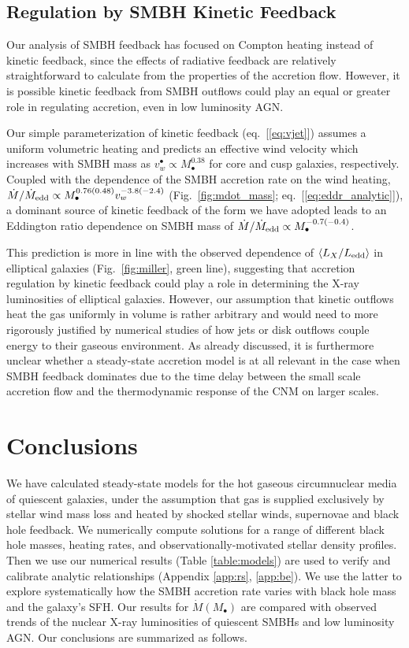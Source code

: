 \documentclass[usenatbib,fleqn]{mn2e}
\newcommand{\Mbh}[1][]{M_{\bullet#1}}
\begin{document}
\subsection{Regulation by SMBH Kinetic Feedback}
\label{sec:kinetic}

Our analysis of SMBH feedback has focused on Compton heating instead
of kinetic feedback, since the effects of radiative feedback are
relatively straightforward to calculate from the properties of the
accretion flow.  However, it is possible kinetic feedback from SMBH
outflows could play an equal or greater role in regulating accretion,
even in low luminosity AGN.

Our simple parameterization of kinetic feedback (eq.~[\ref{eq:vjet}])
assumes a uniform volumetric heating and predicts an effective wind
velocity which increases with SMBH mass as $v_{w}^{\bullet} \propto
M_{\bullet}^{0.38}$ for core and cusp galaxies, respectively.
Coupled with the dependence of the SMBH accretion rate on the wind
heating, $\dot{M}/\dot{M}_{\rm edd} \propto
M_{\bullet}^{0.76(0.48)}v_{w}^{-3.8(-2.4)}$ (Fig.~\ref{fig:mdot_mass};
eq.~[\ref{eq:eddr_analytic}]), a dominant source of kinetic feedback
of the form we have adopted leads to an Eddington ratio dependence on
SMBH mass of $\dot{M}/\dot{M}_{\rm edd} \propto
M_{\bullet}^{-0.7(-0.4)}$.

This prediction is more in line with the observed dependence of
$\langle L_{X}/L_{\rm edd} \rangle$ in elliptical galaxies
(Fig.~\ref{fig:miller}, green line), suggesting that accretion
regulation by kinetic feedback could play a role in determining the
X-ray luminosities of elliptical galaxies.  However, our assumption
that kinetic outflows heat the gas uniformly in volume is rather
arbitrary and would need to more rigorously justified by numerical
studies of how jets or disk outflows couple energy to their gaseous
environment.  As already discussed, it is furthermore unclear whether
a steady-state accretion model is at all relevant in the case when
SMBH feedback dominates due to the time delay between the small scale
accretion flow and the thermodynamic response of the CNM on larger
scales.


\section{Conclusions}
\label{sec:conclusions}

We have calculated steady-state models for the hot gaseous
circumnuclear media of quiescent galaxies, under the assumption that
gas is supplied exclusively by stellar wind mass loss and heated by
shocked stellar winds, supernovae and black hole feedback.  We
numerically compute solutions for a range of different black hole
masses, heating rates, and observationally-motivated stellar density
profiles.  Then we use our numerical results (Table
\ref{table:models}) are used to verify and calibrate analytic
relationships (Appendix \ref{app:rs}, \ref{app:be}).  We use the
latter to explore systematically how the SMBH accretion rate varies
with black hole mass and the galaxy's SFH.  Our results for
$\dot{M}(\Mbh)$ are compared with observed trends of the nuclear X-ray
luminosities of quiescent SMBHs and low luminosity AGN.  Our
conclusions are summarized as follows.
\end{document}
